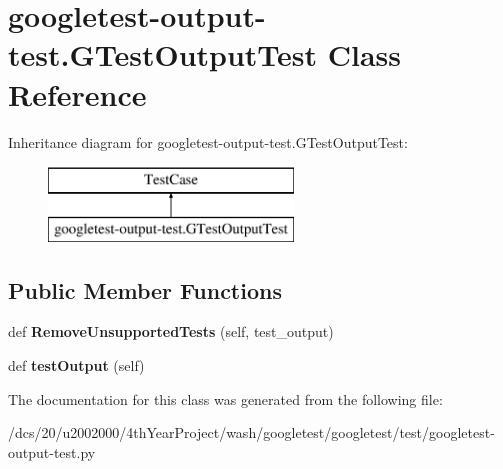\hypertarget{classgoogletest-output-test_1_1GTestOutputTest}{}\section{googletest-\/output-\/test.G\+Test\+Output\+Test Class Reference}
\label{classgoogletest-output-test_1_1GTestOutputTest}
Inheritance diagram for googletest-\/output-\/test.G\+Test\+Output\+Test\+:\begin{figure}[H]
\begin{center}
\leavevmode
\includegraphics[height=2.000000cm]{classgoogletest-output-test_1_1GTestOutputTest}
\end{center}
\end{figure}
\subsection*{Public Member Functions}
\begin{DoxyCompactItemize}
\item 
\mbox{\label{classgoogletest-output-test_1_1GTestOutputTest_af058c7917b05d06b0e6249061db264a3}} 
def {\bfseries Remove\+Unsupported\+Tests} (self, test\+\_\+output)
\item 
\mbox{\label{classgoogletest-output-test_1_1GTestOutputTest_a4ab77925377e6c837d33f07960a31212}} 
def {\bfseries test\+Output} (self)
\end{DoxyCompactItemize}


The documentation for this class was generated from the following file\+:\begin{DoxyCompactItemize}
\item 
/dcs/20/u2002000/4th\+Year\+Project/wash/googletest/googletest/test/googletest-\/output-\/test.\+py\end{DoxyCompactItemize}
